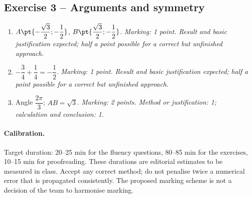 \subsection*{Exercise 3 -- Arguments and symmetry}
\begin{enumerate}
\item $A\pt{-\dfrac{\sqrt 3}{2};-\dfrac{1}{2}}$, $B\pt{\dfrac{\sqrt 3}{2};-\dfrac{1}{2}}$. \textit{Marking: 1 point. Result and basic justification expected; half a point possible for a correct but unfinished approach.}
\item $-\dfrac{3}{4}+\dfrac{1}{4}=-\dfrac{1}{2}$. \textit{Marking: 1 point. Result and basic justification expected; half a point possible for a correct but unfinished approach.}
\item Angle $\dfrac{2\pi}{3}$; $AB=\sqrt3$. \textit{Marking: 2 points. Method or justification: 1; calculation and conclusion: 1.}
\end{enumerate}
\paragraph{Calibration.} Target duration: 20--25 min for the fluency questions, 80--85 min for the exercises, 10--15 min for proofreading. These durations are editorial estimates to be measured in class. Accept any correct method; do not penalise twice a numerical error that is propagated consistently. The proposed marking scheme is not a decision of the team to harmonise marking.
